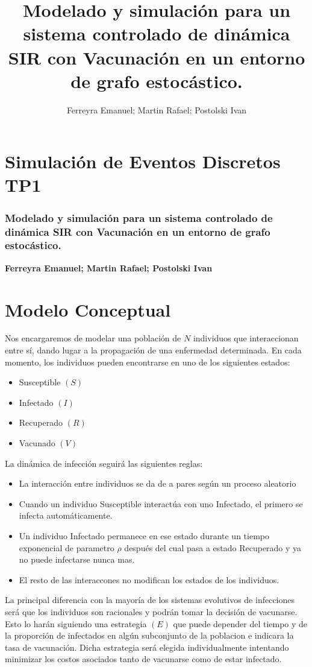 \documentclass[10pt,a4paper]{article}
\author{Ferreyra Emanuel; Martin Rafael; Postolski Ivan}
\title{Modelado y simulación para un sistema controlado de dinámica SIR con Vacunación en un entorno de grafo estocástico.}
\begin{document}
\part*{Simulaci\'on de Eventos Discretos TP1}
\section*{Modelado y simulación para un sistema controlado de dinámica SIR con Vacunación en un entorno de grafo estocástico.}
\textbf{Ferreyra Emanuel; Martin Rafael; Postolski Ivan}
\vspace{3cm}

\part*{Modelo Conceptual}

Nos encargaremos de modelar una poblaci\'on de $N$ individuos que interaccionan entre s\'i, dando lugar a la propagaci\'on de una enfermedad determinada. En cada momento, los individuos pueden encontrarse en uno de los siguientes estados:
\begin{itemize}
\item Susceptible $(S)$
\item Infectado $(I)$
\item Recuperado $(R)$
\item Vacunado $(V)$
\end{itemize}


La din\'amica de infecci\'on seguir\'a las siguientes reglas:


\begin{itemize}
\item La interacci\'on entre individuos se da de a pares seg\'un un proceso aleatorio
\item Cuando un individuo Susceptible interact\'ua con uno Infectado, el primero se infecta autom\'aticamente.
\item Un individuo Infectado permanece en ese estado durante un tiempo exponencial de parametro $\rho$ despu\'es del cual pasa a estado Recuperado y ya no puede infectarse nunca mas.
\item El resto de las interaccones no modifican los estados de los individuos.
\end{itemize}


La principal diferencia con la mayor\'ia de los sistemas evolutivos de infecciones ser\'a que los individuos son racionales y podr\'an tomar la decisi\'on de vacunarse. Esto lo har\'an siguiendo una estrategia $(E)$ que puede depender del tiempo y de la proporci\'on de infectados en alg\'un subconjunto de la poblacion e indicara la tasa de vacunaci\'on.
Dicha estrategia ser\'a elegida individualmente intentando minimizar los costos asociados tanto de vacunarse como de estar infectado.
\end{document}
